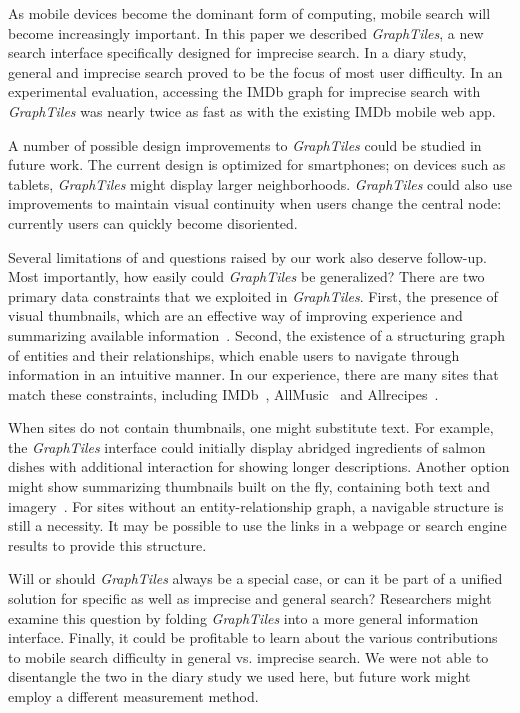 As mobile devices become the dominant form of computing, mobile search will become increasingly important. In this paper we described \textit{GraphTiles}, a new search interface specifically designed for imprecise search. In a diary study, general and imprecise search proved to be the focus of most user difficulty. In an experimental evaluation, accessing the IMDb graph for imprecise search with \textit{GraphTiles} was nearly twice as fast as with the existing IMDb mobile web app.

A number of possible design improvements to \textit{GraphTiles} could be studied in future work. The current design is optimized for smartphones; on devices such as tablets, \textit{GraphTiles} might display larger neighborhoods. \textit{GraphTiles} could also use improvements to maintain visual continuity when users change the central node: currently users can quickly become disoriented. 

Several limitations of and questions raised by our work also deserve follow-up. Most importantly, how easily could \textit{GraphTiles} be generalized?  There are two primary data constraints that we exploited in \textit{GraphTiles}. First, the presence of visual thumbnails, which are an effective way of improving experience and summarizing available information~\cite{Setlur:2011}. Second, the existence of a structuring graph of entities and their relationships, which enable users to navigate through information in an intuitive manner. In our experience, there are many sites that match these constraints, including IMDb~\cite{imdb}, AllMusic~\cite{allmusic} and Allrecipes~\cite{allrecipes}. 

When sites do not contain thumbnails, one might substitute text. For example, the \textit{GraphTiles} interface could initially display abridged ingredients of salmon dishes with additional interaction for showing longer descriptions. Another option might show summarizing thumbnails built on the fly, containing both text and imagery~\cite{Setlur:2011}. For sites without an entity-relationship graph, a navigable structure is still a necessity. It may be possible to use the links in a webpage or search engine results to provide this structure.

Will or should \textit{GraphTiles} always be a special case, or can it be part of a unified solution for specific as well as imprecise and general search? Researchers might examine this question by folding \textit{GraphTiles} into a more general information interface. Finally, it could be profitable to learn about the various contributions to mobile search difficulty in general vs. imprecise search. We were not able to disentangle the two in the diary study we used here, but future work might employ a different measurement method.
